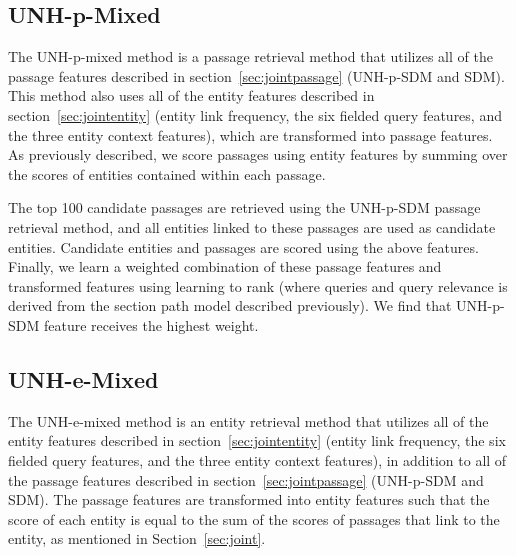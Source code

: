 \documentclass{article}
\begin{document}







\subsection{UNH-p-Mixed}\label{sec:pmixed}

The UNH-p-mixed method is a passage retrieval method that utilizes all of the passage features described in section~\ref{sec:jointpassage} (UNH-p-SDM and SDM). This method also uses all of the entity features described in section~\ref{sec:jointentity} (entity link frequency, the six fielded query features, and the three entity context features), which are transformed into passage features. As previously described, we score passages using entity features by summing over the scores of entities contained within each passage.  

The top 100 candidate passages are retrieved using the UNH-p-SDM passage retrieval method, and all entities linked to these passages are used as candidate entities. Candidate entities and passages are scored using the above features. Finally, we learn a weighted combination of these passage features and transformed features using learning to rank (where queries and query relevance is derived from the section path model described previously). We find that UNH-p-SDM feature receives the highest weight.



\subsection{UNH-e-Mixed}\label{sec:emixed}

The UNH-e-mixed method is an entity retrieval method that utilizes all of the entity features described in section~\ref{sec:jointentity} (entity link frequency, the six fielded query features, and the three entity context features), in addition to all of the passage features described in section~\ref{sec:jointpassage} (UNH-p-SDM and SDM). The passage features are transformed into entity features such that the score of each entity is equal to the sum of the scores of passages that link to the entity, as mentioned in Section~\ref{sec:joint}.
\end{document}
